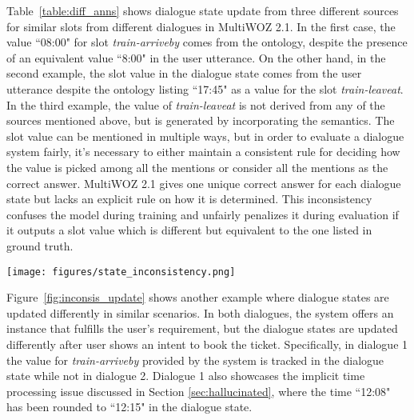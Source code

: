 Table~\ref{table:diff_anns} shows dialogue state update from three different sources for similar slots from different dialogues in MultiWOZ 2.1. In the first case, the value ``08:00" for slot \textit{train-arriveby} comes from the ontology, despite the presence of an equivalent value ``8:00" in the user utterance. On the other hand, in the second example, the slot value in the dialogue state comes from the user utterance despite the ontology listing ``17:45" as a value for the slot \textit{train-leaveat}. In the third example, the value of \textit{train-leaveat} is not derived from any of the sources mentioned above, but is generated by incorporating the semantics. The slot value can be mentioned in multiple ways, but in order to evaluate a dialogue system fairly, it's necessary to either maintain a consistent rule for deciding how the value is picked among all the mentions or consider all the mentions as the correct answer. MultiWOZ 2.1 gives one unique correct answer for each dialogue state but lacks an explicit rule on how it is determined. This inconsistency confuses the model during training and unfairly penalizes it during evaluation if it outputs a slot value which is different but equivalent to the one listed in ground truth.

\begin{figure*}[t]
\centering
\texttt{[image: figures/state\_inconsistency.png]}
\caption{Example of dialogues states being updated differently in similar scenarios. In both dialogues, user accepts a train offered by the system. In dialogue 1, \textit{train-arriveby} is annotated in the dialogue state after user's agreement, but not in dialogue 2. Dialogue 1 also shows implicit time processing, where the value 12:08 in the system utterance is rewritten to 12:15 in the subsequent dialogue state.}
\label{fig:inconsis_update}
\end{figure*}

Figure~\ref{fig:inconsis_update} shows another example where dialogue states are updated differently in similar scenarios. In both dialogues, the system offers an instance that fulfills the user's requirement, but the dialogue states are updated differently after user shows an intent to book the ticket. Specifically, in dialogue 1 the value for \textit{train-arriveby} provided by the system is tracked in the dialogue state while not in dialogue 2. Dialogue 1 also showcases the implicit time processing issue discussed in Section \ref{sec:hallucinated}, where the time ``12:08" has been rounded to ``12:15" in the dialogue state.

